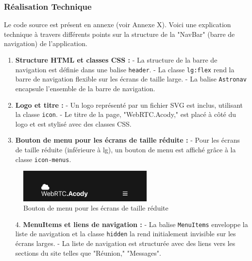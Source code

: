 \documentclass[12pt, a4paper, oneside]{Thesis}
\begin{document}
\subsubsection{Réalisation Technique}
Le code source est présent en annexe (voir Annexe X). Voici une explication technique à travers différents points sur la structure de la "NavBar" (barre de navigation) de l'application.

\begin{enumerate}
    \item \textbf{Structure HTML et classes CSS :}
    - La structure de la barre de navigation est définie dans une balise \texttt{header}.
    - La classe \texttt{lg:flex} rend la barre de navigation flexible sur les écrans de taille large.
    - La balise \texttt{Astronav} encapsule l'ensemble de la barre de navigation.

    \item \textbf{Logo et titre :}
    - Un logo représenté par un fichier SVG est inclus, utilisant la classe \texttt{icon}.
    - Le titre de la page, "WebRTC.Acody," est placé à côté du logo et est stylisé avec des classes CSS.

    \item \textbf{Bouton de menu pour les écrans de taille réduite :}
    - Pour les écrans de taille réduite (inférieure à lg), un bouton de menu est affiché grâce à la classe \texttt{icon-menus}.

\end{enumerate}

\begin{figure}[h]
    \centering
    \includegraphics[width=0.6\textwidth]{images/NavBarMobileClose.png}
    \caption{Bouton de menu pour les écrans de taille réduite}
\end{figure}

\begin{enumerate}
    \item[4.] \textbf{MenuItems et liens de navigation :}
    - La balise \texttt{MenuItems} enveloppe la liste de navigation et la classe \texttt{hidden} la rend initialement invisible sur les écrans larges.
    - La liste de navigation est structurée avec des liens vers les sections du site telles que "Réunion," "Messages".

\end{enumerate}
\end{document}
